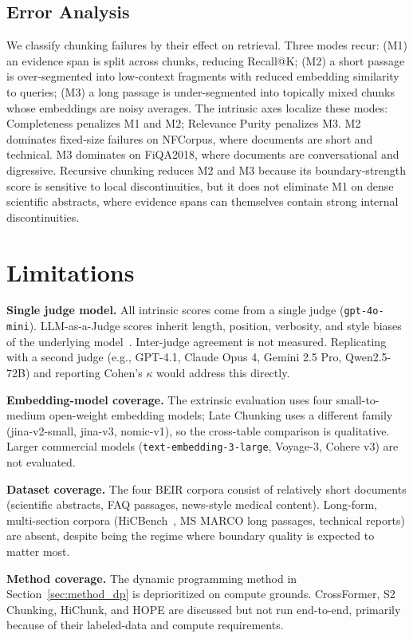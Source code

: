 \subsection{Error Analysis}
We classify chunking failures by their effect on retrieval. Three modes recur: (M1) an evidence span is split across chunks, reducing Recall@K; (M2) a short passage is over-segmented into low-context fragments with reduced embedding similarity to queries; (M3) a long passage is under-segmented into topically mixed chunks whose embeddings are noisy averages. The intrinsic axes localize these modes: Completeness penalizes M1 and M2; Relevance Purity penalizes M3. M2 dominates fixed-size failures on NFCorpus, where documents are short and technical. M3 dominates on FiQA2018, where documents are conversational and digressive. Recursive chunking reduces M2 and M3 because its boundary-strength score is sensitive to local discontinuities, but it does not eliminate M1 on dense scientific abstracts, where evidence spans can themselves contain strong internal discontinuities.

\section{Limitations}
\label{sec:limitations}

\textbf{Single judge model.} All intrinsic scores come from a single judge (\texttt{gpt-4o-mini}). LLM-as-a-Judge scores inherit length, position, verbosity, and style biases of the underlying model~\cite{tan2024judgebench,liu2025consjudge}. Inter-judge agreement is not measured. Replicating with a second judge (e.g., GPT-4.1, Claude Opus 4, Gemini 2.5 Pro, Qwen2.5-72B) and reporting Cohen's $\kappa$ would address this directly.

\textbf{Embedding-model coverage.} The extrinsic evaluation uses four small-to-medium open-weight embedding models; Late Chunking uses a different family (jina-v2-small, jina-v3, nomic-v1), so the cross-table comparison is qualitative. Larger commercial models (\texttt{text-embedding-3-large}, Voyage-3, Cohere v3) are not evaluated.

\textbf{Dataset coverage.} The four BEIR corpora consist of relatively short documents (scientific abstracts, FAQ passages, news-style medical content). Long-form, multi-section corpora (HiCBench~\cite{lu2025hichunk}, MS MARCO long passages, technical reports) are absent, despite being the regime where boundary quality is expected to matter most.

\textbf{Method coverage.} The dynamic programming method in Section~\ref{sec:method_dp} is deprioritized on compute grounds. CrossFormer, S2 Chunking, HiChunk, and HOPE are discussed but not run end-to-end, primarily because of their labeled-data and compute requirements.

